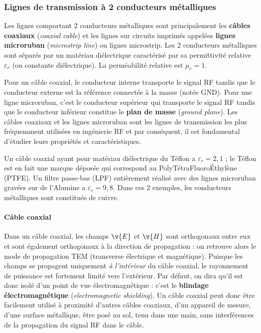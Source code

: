 \subsubsection{Lignes de transmission à 2 conducteurs métalliques}
Les lignes comportant 2 conducteurs métalliques sont principalement les
\textbf{câbles coaxiaux} (\textit{coaxial cable}) et les lignes sur circuits
imprimés appelées \textbf{lignes microruban} (\textit{microstrip line}) ou
lignes microstrip. Les 2 conducteurs métalliques sont séparés par un matériau
diélectrique caractérisé par sa permittivité relative $\varepsilon_r$ (ou
constante diélectrique). La perméabilité relative est $\mu_r = 1$.

Pour un câble coaxial, le conducteur interne transporte le signal RF tandis que
le conducteur externe est la référence connectée à la masse (notée GND). Pour
une ligne microruban, c'est le conducteur supérieur qui transporte le signal RF
tandis que le conducteur inférieur constitue le \textbf{plan de masse}
(\textit{ground plane}). Les câbles coaxiaux et les lignes microruban sont les
lignes de transmission les plus fréquemment utilisées en ingénierie RF et par
conséquent, il est fondamental d'étudier leurs propriétés et caractéristiques.

\begin{example}
  Un câble coaxial ayant pour matériau diélectrique du Téflon a
  $\varepsilon_r = 2{,}1$ ; le Téflon est en fait une marque déposée qui
  correspond au PolyTétraFluoroÉthylène (PTFE). Un filtre passe-bas (LPF)
  entièrement réalisé avec des lignes microruban gravées sur de l'Alumine a
  $\varepsilon_r = 9{,}8$. Dans ces 2 exemples, les conducteurs métalliques sont
  constitués de cuivre.
\end{example}

\paragraph{Câble coaxial}
Dans un câble coaxial, les champs $\v{E}$ et $\v{H}$ sont orthogonaux entre eux
et sont également orthogonaux à la direction de propagation : on retrouve alors
le mode de propagation TEM (transverse électrique et magnétique). Puisque les
champs se propagent uniquement \emph{à l'intérieur} du câble coaxial, le
rayonnement de puissance est fortement limité vers l'extérieur. Par défaut, on
dira qu'il est donc isolé d'un point de vue électromagnétique : c'est le
\textbf{blindage électromagnétique} (\textit{electromagnetic shielding}). Un
câble coaxial peut donc être facilement utilisé à proximité d'autres câbles
coaxiaux, d'un appareil de mesure, d'une surface métallique, être posé au sol,
tenu dans une main, sans interférences de la propagation du signal RF dans le
câble.


